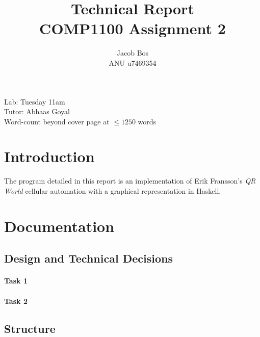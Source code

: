 \documentclass[11pt]{article}
\title{Technical Report\\ COMP1100 Assignment 2}
\author{Jacob Bos\\ ANU u7469354}
\begin{document}
\maketitle
{}
\begin{center}
  Lab: Tuesday 11am\\
  Tutor: Abhaas Goyal\\
  Word-count beyond cover page at $\leq 1250$ words
\end{center}
\tableofcontents
\newpage
{}
\section*{Introduction} 
The program detailed in this report is an implementation of Erik Fransson's \textit{QR World} cellular automation with a graphical representation in Haskell.


\section{Documentation}%
\subsection{Design and Technical Decisions}
\paragraph{Task 1}
\paragraph{Task 2}


\subsection{Structure}
\end{document}
